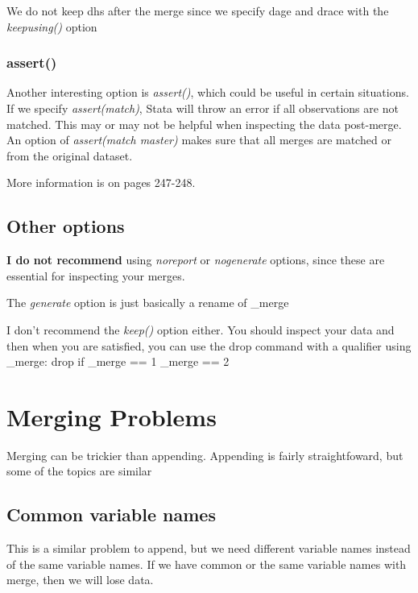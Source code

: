 \documentclass[
]{book}
\begin{document}
We do not keep dhs after the merge since we specify dage and drace with the \emph{keepusing()} option

\subsubsection*{assert()}\label{assert}

Another interesting option is \emph{assert()}, which could be useful in certain situations. If we specify \emph{assert(match)}, Stata will throw an error if all observations are not matched. This may or may not be helpful when inspecting the data post-merge. An option of \emph{assert(match master)} makes sure that all merges are matched or from the original dataset.

More information is on pages 247-248.

\subsection*{Other options}\label{other-options}

\textbf{I do not recommend} using \emph{noreport} or \emph{nogenerate} options, since these are
essential for inspecting your merges.

The \emph{generate} option is just basically a rename of \_merge

I don't recommend the \emph{keep()} option either. You should inspect your data and then when you are satisfied, you can use the drop command with a qualifier using \_merge: drop if \_merge == 1 \textbar{} \_merge == 2

\section{Merging Problems}\label{merging-problems}

Merging can be trickier than appending. Appending is fairly straightfoward,
but some of the topics are similar

\subsection*{Common variable names}\label{common-variable-names}

This is a similar problem to append, but we need different variable names instead of the same variable names. If we have common or the same variable names with merge, then we will lose data.
\end{document}
